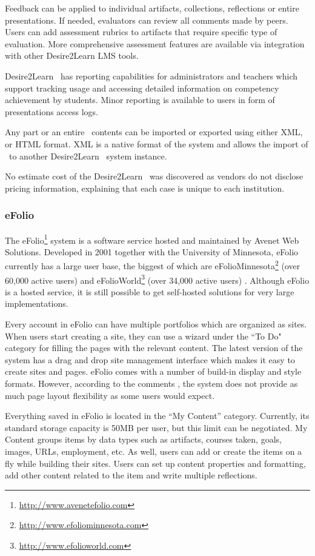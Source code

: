 Feedback can be applied to individual artifacts, collections, reflections or
entire presentations. If needed, evaluators can review all comments made by
peers. Users can add assessment rubrics to artifacts that require specific
type of evaluation. More comprehensive assessment features are available via
integration with other Desire2Learn LMS tools. 

Desire2Learn \ep~has reporting capabilities for administrators and teachers
which support tracking usage and accessing detailed information on competency
achievement by students. Minor reporting is available to users in form of
presentations access logs.

Any part or an entire \ep~contents can be imported or exported using either XML,
or HTML format. XML is a native format of the system and allows the import of
\ep~to another Desire2Learn \ep~system instance.

No estimate cost of the Desire2Learn \ep~was discovered as vendors do not
disclose pricing information, explaining that each case is unique to each
institution.
 
\subsubsection{eFolio}

The eFolio\footnote{\url{http://www.avenetefolio.com}} system is a software
service hosted and maintained by Avenet Web Solutions. Developed in 2001
together with the University of Minnesota, eFolio currently has a large user
base, the biggest of which are
eFolioMinnesota\footnote{\url{http://www.efoliominnesota.com}} (over 60,000
active users) and eFolioWorld\footnote{\url{http://www.efolioworld.com}} (over
34,000 active users) \citep{AAEEBL2011}. Although eFolio is a hosted service, it
is still possible to get self-hosted solutions for very large implementations.

Every account in eFolio can have multiple portfolios which are organized as
sites. When users start creating a site, they can use a wizard under the ``To
Do" category for filling the pages with the relevant content. The latest version
of the system has a drag and drop site management interface which makes it easy to
create sites and pages. eFolio comes with a number of build-in display and style
formats. However, according to the comments \citep{AAEEBL2011}, the system
does not provide as much page layout flexibility as some users would expect.

Everything saved in eFolio is located in the ``My Content'' category. Currently,
its standard storage capacity is 50MB per user, but this limit can be
negotiated. My Content groups items by data types such as artifacts, courses
taken, goals, images, URLs, employment, etc. As well, users can add or create
the items on a fly while building their sites. Users can set up content properties
and formatting, add other content related to the item and write multiple
reflections.

